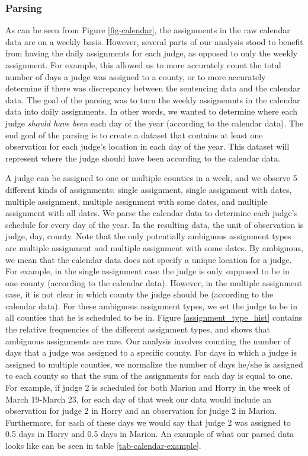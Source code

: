 \documentclass[11pt, oneside]{article}   	%
\theoremstyle{ModifiedStyle}
\begin{document}
    \subsubsection{Parsing}
      As can be seen from Figure \ref{fig-calendar}, the assignments in the raw calendar data are on a weekly basis. However, several parts of our analysis stood to benefit from having the daily assignments for each judge, as opposed to only the weekly assignment. For example, this allowed us to more accurately count the total number of days a judge was assigned to a county, or to more accurately determine if there was discrepancy between the sentencing data and the calendar data. The goal of the parsing was to turn the weekly assignemnts in the calendar data into daily assignments. In other words, we wanted to determine where each judge \textit{should have been} each day of the year (according to the calendar data). The end goal of the parsing is to create a dataset that contains at least one observation for each judge's location in each day of the year. This dataset will represent where the judge should have been according to the calendar data.

      A judge can be assigned to one or multiple counties in a week, and we observe 5 different kinds of assignments: single assignment, single assignment with dates, multiple assignment, multiple assignment with some dates, and multiple assignment with all dates. We parse the calendar data to determine each judge's schedule for every day of the year. In the resulting data, the unit of observation is judge, day, county. Note that the only potentially ambiguous assignment types are multiple assignment and multiple assignment with some dates. By ambiguous, we mean that the calendar data does not specify a unique location for a judge. For example, in the single assignment case the judge is only supposed to be in one county (according to the calendar data). However, in the multiple assignment case, it is not clear in which county the judge should be (according to the calendar data). For these ambiguous assignment types, we set the judge to be in all counties that he is scheduled to be in. Figure \ref{assignment_type_hist} contains the relative frequencies of the different assignment types, and shows that ambiguous assignments are rare. Our analysis involves counting the number of days that a judge was assigned to a specific county. For days in which a judge is assigned to multiple counties, we normalize the number of days he/she is assigned to each county so that the sum of the assignments for each day is equal to one. For example, if judge 2 is scheduled for both Marion and Horry in the week of March 19-March 23, for each day of that week our data would include an observation for judge 2 in Horry and an observation for judge 2 in Marion. Furthermore, for each of these days we would say that judge 2 was assigned to 0.5 days in Horry and 0.5 days in Marion. An example of what our parsed data looks like can be seen in table \ref{tab-calendar-example}.
\end{document}

